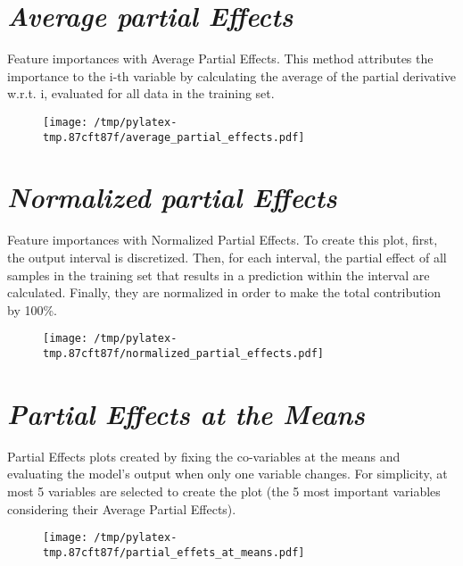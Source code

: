\documentclass{article}%
\begin{document}
\section*{\textit{Average partial Effects}}%
\label{sec:textitAveragepartialEffects}%

                Feature importances with Average Partial Effects. This method
                attributes the importance to the i-th variable by calculating
                the average of the partial derivative w.r.t. i, evaluated for
                all data in the training set.

                \vfill%


\begin{figure}[H]%
\centering%
\texttt{[image: /tmp/pylatex-tmp.87cft87f/average\_partial\_effects.pdf]}%
\end{figure}

%
\vfill \pagebreak

%
\section*{\textit{Normalized partial Effects}}%
\label{sec:textitNormalizedpartialEffects}%

                Feature importances with Normalized Partial Effects. 
                To create this plot, first, the output interval is discretized.
                Then, for each interval, the partial effect of all samples
                in the training set that results in a prediction within the
                interval are calculated. Finally, they are normalized in
                order to make the total contribution by 100\%.

                \vfill%


\begin{figure}[H]%
\centering%
\texttt{[image: /tmp/pylatex-tmp.87cft87f/normalized\_partial\_effects.pdf]}%
\end{figure}

%
\vfill \pagebreak

%
\section*{\textit{Partial Effects at the Means}}%
\label{sec:textitPartialEffectsattheMeans}%

                Partial Effects plots created by fixing the co-variables at
                the means and evaluating the model's output when only one
                variable changes. For simplicity, at most 5 variables are
                selected to create the plot (the 5 most important variables
                considering their Average Partial Effects).

                \vfill%


\begin{figure}[H]%
\centering%
\texttt{[image: /tmp/pylatex-tmp.87cft87f/partial\_effets\_at\_means.pdf]}%
\end{figure}

%
\vfill \pagebreak

%
\end{document}

